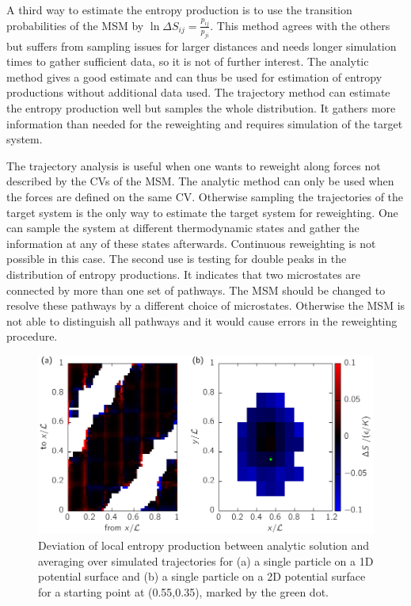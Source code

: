 A third way to estimate the entropy production is to use the transition probabilities of  the MSM by $ \ln \Delta S_{ij} = \frac{p_{ij}}{p_{ji}}$. This method agrees with the others but suffers from sampling issues for larger distances and needs longer simulation times to gather sufficient data, so it is not of further interest. The analytic method gives a good estimate and can thus be used for estimation of entropy productions without additional data used. The trajectory method can estimate the entropy production well but samples the whole distribution. It gathers more information than needed for the reweighting and requires simulation of the target system.  

The trajectory analysis is useful when one wants to reweight along forces not described by the CVs of the MSM.  The analytic method can only be used when the forces are defined on the same CV. Otherwise sampling the trajectories of the target system is the only way to estimate the target system for reweighting. One can sample the system at different thermodynamic states and gather the information at any of these states afterwards. Continuous reweighting is not possible in this case. The second use is testing for double peaks in the distribution of entropy productions. It indicates that two microstates are connected by more than one set of pathways. The MSM should be changed to resolve these pathways by a different choice of microstates. Otherwise the MSM is not able to distinguish all pathways and it would cause errors in the reweighting procedure. 

\begin{figure}[t]
\centering
 \includegraphics{../plots/Complementary/Sdiff.pdf}
 \caption[Deviation of local entropy production between analytic solution and averaging over simulated trajectories for (a) a single particle on a 1D potential surface and (b) a single particle on a 2D potential surface for a chosen starting point.]{Deviation of local entropy production between analytic solution and averaging over simulated trajectories for (a) a single particle on a 1D potential surface and (b) a single particle on a 2D potential surface for a starting point at (0.55,0.35), marked by the green dot.  }
 \label{fig:Sdiff}
\end{figure}


